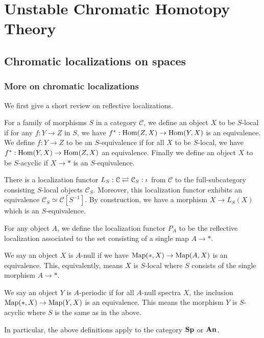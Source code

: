 \part{Unstable Chromatic Homotopy Theory}

\chapter{Chromatic localizations on spaces}

\section{More on chromatic localizations}

	We first give a short review on reflective localizations. 
	\begin{defn}
		For a family of morphisms $S$ in a category $\mathcal{C}$, we define an object $X$ to be $S$-local if for any $f:Y\to Z$ in $S$, we have $f^*:\operatorname{\mathrm{Hom}}(Z,X)\to\operatorname{\mathrm{Hom}}(Y,X)$ is an equivalence. We define $f:Y\to Z$ to be an $S$-equivalence if for all $X$ to be $S$-local, we have $f^*:\operatorname{\mathrm{Hom}}(Y,X)\to\operatorname{\mathrm{Hom}}(Z,X)$ an equivalence. Finally we define an object $X$ to be $S$-acyclic if $X\to *$ is an $S$-equivalence. 
	\end{defn}

	\begin{thm}\label{Refl_loc}
		There is a localization functor $L_S:\mathcal{C}\rightleftarrows\mathcal{C}_S:\iota$ from $\mathcal{C}$ to the full-subcategory consisting $S$-local objects $\mathcal{C}_S$. Moreover, this localization functor exhibits an equivalence $\mathcal{C}_S\simeq\mathcal{C}[S^{-1}]$. By construction, we have a morphism $X\to L_S(X)$ which is an $S$-equivalence. 
	\end{thm}

	\begin{defn}\label{Null_loc_equiv}
		For any object $A$, we define the localization functor $P_A$ to be the reflective localization associated to the set consisting of a single map $A\to *$. 

		We say an object $X$ is $A$-null if we have $\operatorname{\mathrm{Map}}(*,X)\to\operatorname{\mathrm{Map}}(A,X)$ is an equivalence. This, equivalently, means $X$ is $S$-local where $S$ consists of the single morphism $A\to *$. 

		We say an object $Y$ is $A$-periodic if for all $A$-null spectra $X$, the inclusion $\operatorname{\mathrm{Map}}(*,X)\to\operatorname{\mathrm{Map}}(Y,X)$ is an equivalence. This means the morphism $Y$ is $S$-acyclic where $S$ is the same as in the above. 

		In particular, the above definitions apply to the category $\mathbf{Sp}$ or $\mathbf{An}$. 
	\end{defn}

